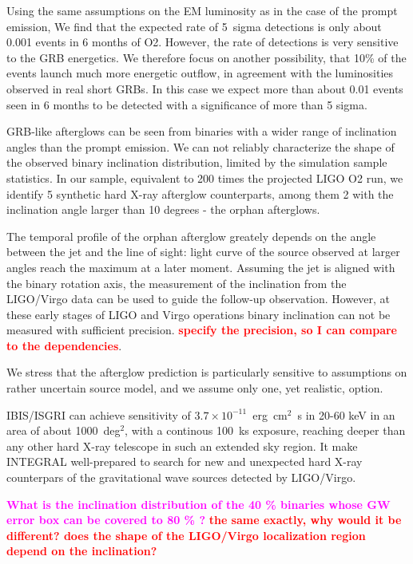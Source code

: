 \documentclass[11pt]{article}
\newcommand{\ECM}[1] {\textbf{\textcolor{magenta}{#1}}}
\newcommand{\vs}[1] {\textbf{\textcolor{red}{#1}}}
\begin{document}
Using the same assumptions on the EM luminosity as in the case of the
prompt emission, We find that the expected rate of 5~sigma detections
is only about 0.001 events in 6 months of O2. However, the rate of
detections is very sensitive to the GRB energetics.  We therefore
focus on another possibility, that 10\% of the events launch much more
energetic outflow, in agreement with the luminosities observed in real
short GRBs. In this case we expect more than about 0.01 events seen in
6 months to be detected with a significance of more than 5 sigma.

GRB-like afterglows can be seen from binaries with a wider range of
inclination angles than the prompt emission. We can not reliably
characterize the shape of the observed binary inclination
distribution, limited by the simulation sample statistics. In our
sample, equivalent to 200 times the projected LIGO O2 run, we identify
5 synthetic hard X-ray afterglow counterparts, among them 2 with the
inclination angle larger than 10 degrees - the orphan afterglows.

The temporal profile of the orphan afterglow greately depends on the
angle between the jet and the line of sight: light curve of the
source observed at larger angles reach the maximum at a later
moment. Assuming the jet is aligned with the binary rotation axis, the
measurement of the inclination from the LIGO/Virgo data can be used to
guide the follow-up observation. However, at these early stages of
LIGO and Virgo operations binary inclination can not be measured with
sufficient precision. \vs{specify the precision, so I can compare to
  the dependencies}.

We stress that the afterglow prediction is particularly sensitive to
assumptions on rather uncertain source model, and we assume only
one, yet realistic, option.

IBIS/ISGRI can achieve sensitivity of $3.7 \times
10^{-11}$~erg~cm$^2$~s in 20-60 keV in an area of about
1000~deg$^{2}$, with a continous 100~ks exposure, reaching deeper than
any other hard X-ray telescope in such an extended sky region. It make
INTEGRAL well-prepared to search for new and unexpected hard X-ray
counterpars of the gravitational wave sources detected by LIGO/Virgo.


\ECM{What is the inclination distribution of the 40 \% binaries whose GW error
  box can be covered to 80 \% ?}
\vs{the same exactly, why would it be different? does the shape of the LIGO/Virgo localization region depend on the inclination?
}
\end{document}

